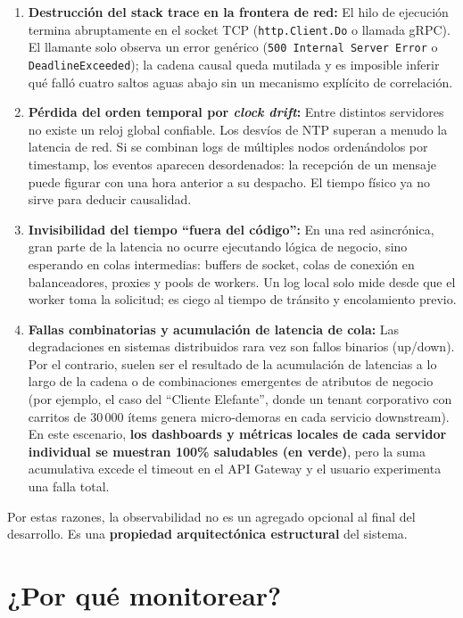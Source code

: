 \documentclass[variant=apuntes,cover=institutional,mode=screen]{ua-engineering-v6-article}
\begin{document}
\begin{enumerate}
\item \textbf{Destrucción del stack trace en la frontera de red:} El hilo de ejecución termina abruptamente en el socket TCP (\texttt{http.Client.Do} o llamada gRPC). El llamante solo observa un error genérico (\texttt{500 Internal Server Error} o \texttt{DeadlineExceeded}); la cadena causal queda mutilada y es imposible inferir qué falló cuatro saltos aguas abajo sin un mecanismo explícito de correlación.
\item \textbf{Pérdida del orden temporal por \emph{clock drift}:} Entre distintos servidores no existe un reloj global confiable. Los desvíos de NTP superan a menudo la latencia de red. Si se combinan logs de múltiples nodos ordenándolos por timestamp, los eventos aparecen desordenados: la recepción de un mensaje puede figurar con una hora anterior a su despacho. El tiempo físico ya no sirve para deducir causalidad.
\item \textbf{Invisibilidad del tiempo ``fuera del código'':} En una red asincrónica, gran parte de la latencia no ocurre ejecutando lógica de negocio, sino esperando en colas intermedias: buffers de socket, colas de conexión en balanceadores, proxies y pools de workers. Un log local solo mide desde que el worker toma la solicitud; es ciego al tiempo de tránsito y encolamiento previo.
\item \textbf{Fallas combinatorias y acumulación de latencia de cola:} Las degradaciones en sistemas distribuidos rara vez son fallos binarios (up/down). Por el contrario, suelen ser el resultado de la acumulación de latencias a lo largo de la cadena o de combinaciones emergentes de atributos de negocio (por ejemplo, el caso del ``Cliente Elefante'', donde un tenant corporativo con carritos de 30\,000 ítems genera micro-demoras en cada servicio downstream). En este escenario, \textbf{los dashboards y métricas locales de cada servidor individual se muestran 100\% saludables (en verde)}, pero la suma acumulativa excede el timeout en el API Gateway y el usuario experimenta una falla total.
\end{enumerate}

Por estas razones, la observabilidad no es un agregado opcional al final del desarrollo. Es una \textbf{propiedad arquitectónica estructural} del sistema.

\section{¿Por qué monitorear?}
\end{document}
